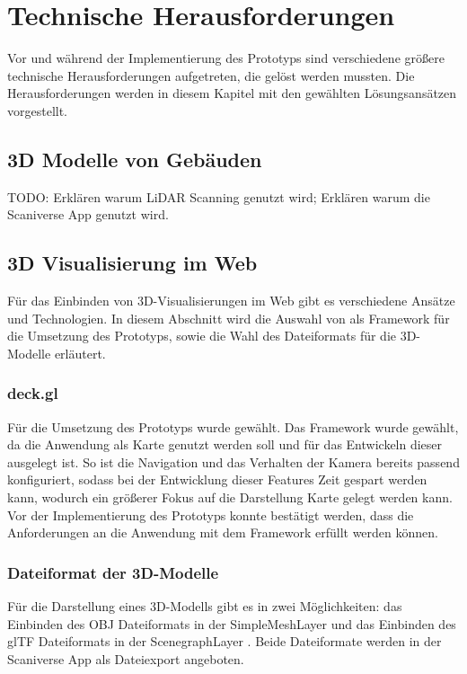 \newpage
\section{Technische Herausforderungen}
Vor und während der Implementierung des Prototyps sind verschiedene größere technische Herausforderungen aufgetreten, die gelöst werden mussten. Die Herausforderungen werden in diesem Kapitel mit den gewählten Lösungsansätzen vorgestellt. 

\subsection{3D Modelle von Gebäuden}
TODO: Erklären warum \ac{LiDAR} Scanning genutzt wird; Erklären warum die Scaniverse App genutzt wird.

\subsection{3D Visualisierung im Web}
Für das Einbinden von 3D-Visualisierungen im Web gibt es verschiedene Ansätze und Technologien. In diesem Abschnitt wird die Auswahl von \deckgl{} als Framework für die Umsetzung des Prototyps, sowie die Wahl des Dateiformats für die 3D-Modelle erläutert.

\subsubsection{deck.gl}
Für die Umsetzung des Prototyps wurde \deckgl{} gewählt. Das Framework wurde gewählt, da die Anwendung als Karte genutzt werden soll und \deckgl{} für das Entwickeln dieser ausgelegt ist. So ist die Navigation und das Verhalten der Kamera bereits passend konfiguriert, sodass bei der Entwicklung dieser Features Zeit gespart werden kann, wodurch ein größerer Fokus auf die Darstellung Karte gelegt werden kann. Vor der Implementierung des Prototyps konnte bestätigt werden, dass die Anforderungen an die Anwendung mit dem Framework erfüllt werden können.

\subsubsection{Dateiformat der 3D-Modelle}\label{sec:ModelFileFormat}
Für die Darstellung eines 3D-Modells gibt es in \deckgl{} zwei Möglichkeiten: das Einbinden des \ac{OBJ} Dateiformats in der SimpleMeshLayer \cite{DeckglSimpleMeshLayer} und das Einbinden des \ac{glTF} Dateiformats in der ScenegraphLayer \cite{DeckglScenegraphLayer}. Beide Dateiformate werden in der Scaniverse App als Dateiexport angeboten.

